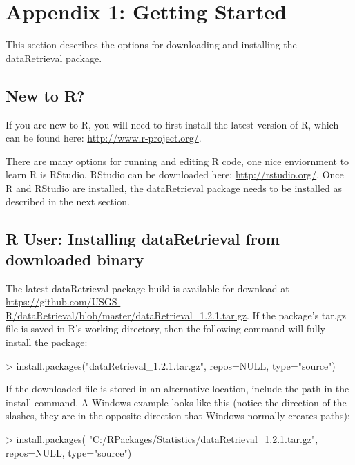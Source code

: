 \documentclass[a4paper,11pt]{article}
\begin{document}
\section{Appendix 1: Getting Started}
This section describes the options for downloading and installing the dataRetrieval package.

\subsection{New to R?}
If you are new to R, you will need to first install the latest version of R, which can be found here: \url{http://www.r-project.org/}.

There are many options for running and editing R code, one nice enviornment to learn R is RStudio. RStudio can be downloaded here: \url{http://rstudio.org/}. Once R and RStudio are installed, the dataRetrieval package needs to be installed as described in the next section.

\subsection{R User: Installing dataRetrieval from downloaded binary}
The latest dataRetrieval package build is available for download at \url{https://github.com/USGS-R/dataRetrieval/blob/master/dataRetrieval_1.2.1.tar.gz}.  If the package's tar.gz file is saved in R's working directory, then the following command will fully install the package:

\begin{Schunk}
\begin{Sinput}
> install.packages("dataRetrieval_1.2.1.tar.gz", 
                  repos=NULL, type="source")
\end{Sinput}
\end{Schunk}

If the downloaded file is stored in an alternative location, include the path in the install command.  A Windows example looks like this (notice the direction of the slashes, they are in the opposite direction that Windows normally creates paths):

\begin{Schunk}
\begin{Sinput}
> install.packages(
   "C:/RPackages/Statistics/dataRetrieval_1.2.1.tar.gz", 
   repos=NULL, type="source")
\end{Sinput}
\end{Schunk}
\end{document}

